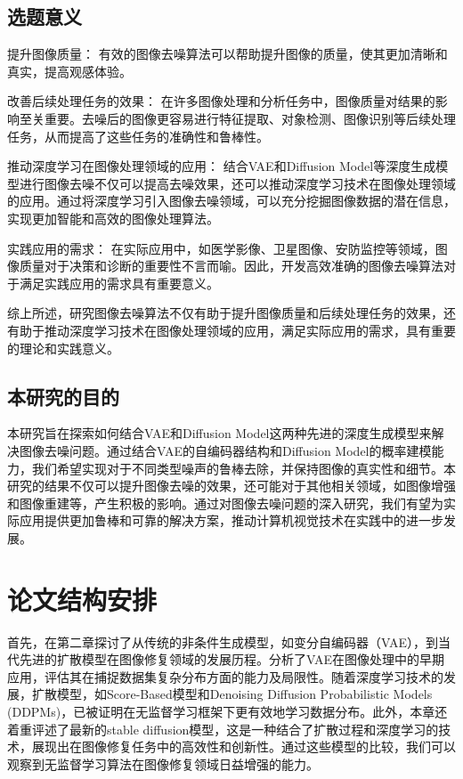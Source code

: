 \subsection*{选题意义}
提升图像质量： 有效的图像去噪算法可以帮助提升图像的质量，使其更加清晰和真实，提高观感体验。\par 
改善后续处理任务的效果： 在许多图像处理和分析任务中，图像质量对结果的影响至关重要。去噪后的图像更容易进行特征提取、对象检测、图像识别等后续处理任务，从而提高了这些任务的准确性和鲁棒性。\par 
推动深度学习在图像处理领域的应用： 结合VAE和Diffusion Model等深度生成模型进行图像去噪不仅可以提高去噪效果，还可以推动深度学习技术在图像处理领域的应用。通过将深度学习引入图像去噪领域，可以充分挖掘图像数据的潜在信息，实现更加智能和高效的图像处理算法。\par 
实践应用的需求： 在实际应用中，如医学影像、卫星图像、安防监控等领域，图像质量对于决策和诊断的重要性不言而喻。因此，开发高效准确的图像去噪算法对于满足实践应用的需求具有重要意义。\par 
综上所述，研究图像去噪算法不仅有助于提升图像质量和后续处理任务的效果，还有助于推动深度学习技术在图像处理领域的应用，满足实际应用的需求，具有重要的理论和实践意义。
\subsection*{本研究的目的}
本研究旨在探索如何结合VAE和Diffusion Model这两种先进的深度生成模型来解决图像去噪问题。通过结合VAE的自编码器结构和Diffusion Model的概率建模能力，我们希望实现对于不同类型噪声的鲁棒去除，并保持图像的真实性和细节。本研究的结果不仅可以提升图像去噪的效果，还可能对于其他相关领域，如图像增强和图像重建等，产生积极的影响。通过对图像去噪问题的深入研究，我们有望为实际应用提供更加鲁棒和可靠的解决方案，推动计算机视觉技术在实践中的进一步发展。
\section{论文结构安排}
首先，在第二章探讨了从传统的非条件生成模型，如变分自编码器（VAE），到当代先进的扩散模型在图像修复领域的发展历程。分析了VAE在图像处理中的早期应用，评估其在捕捉数据集复杂分布方面的能力及局限性。随着深度学习技术的发展，扩散模型，如Score-Based模型和Denoising Diffusion Probabilistic Models (DDPMs)，已被证明在无监督学习框架下更有效地学习数据分布。此外，本章还着重评述了最新的stable diffusion模型，这是一种结合了扩散过程和深度学习的技术，展现出在图像修复任务中的高效性和创新性。通过这些模型的比较，我们可以观察到无监督学习算法在图像修复领域日益增强的能力。    

